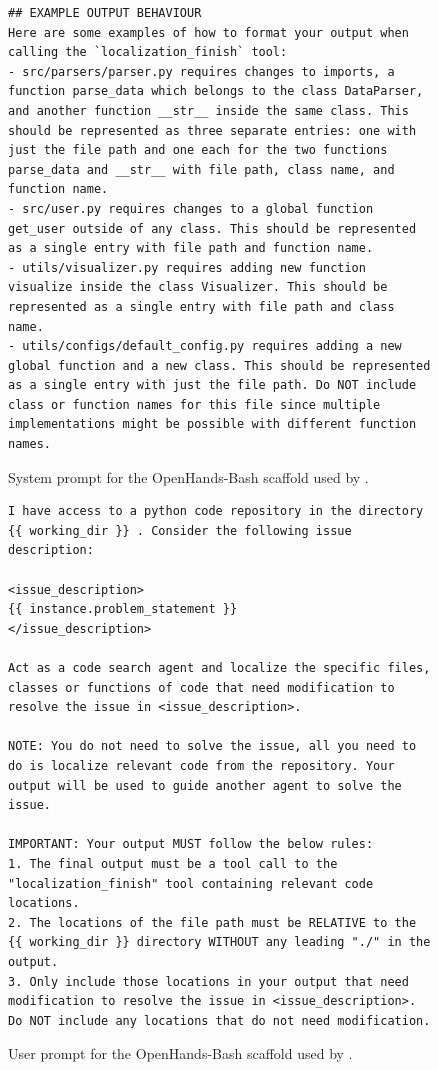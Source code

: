 \begin{figure}[!ht]
\begin{tcolorbox}[colback=blue!6!white, colframe=blue!75!black, title=System Prompt for the OpenHands-Bash agent used by \methodname]
\begin{lstlisting}
## EXAMPLE OUTPUT BEHAVIOUR
Here are some examples of how to format your output when calling the `localization_finish` tool:
- src/parsers/parser.py requires changes to imports, a function parse_data which belongs to the class DataParser, and another function __str__ inside the same class. This should be represented as three separate entries: one with just the file path and one each for the two functions parse_data and __str__ with file path, class name, and function name.
- src/user.py requires changes to a global function get_user outside of any class. This should be represented as a single entry with file path and function name.
- utils/visualizer.py requires adding new function visualize inside the class Visualizer. This should be represented as a single entry with file path and class name.
- utils/configs/default_config.py requires adding a new global function and a new class. This should be represented as a single entry with just the file path. Do NOT include class or function names for this file since multiple implementations might be possible with different function names.
\end{lstlisting}
\end{tcolorbox}
\caption{System prompt for the OpenHands-Bash scaffold used by \methodname.}
\label{fig:system_prompt2}
\end{figure}



\begin{figure}[!ht]
    \centering
\begin{tcolorbox}[colback=orange!6!white, colframe=orange!75!black, title=User prompt for the OpenHands-Bash agent used by \methodname]
\begin{lstlisting}
I have access to a python code repository in the directory {{ working_dir }} . Consider the following issue description:

<issue_description>
{{ instance.problem_statement }}
</issue_description>

Act as a code search agent and localize the specific files, classes or functions of code that need modification to resolve the issue in <issue_description>.

NOTE: You do not need to solve the issue, all you need to do is localize relevant code from the repository. Your output will be used to guide another agent to solve the issue.

IMPORTANT: Your output MUST follow the below rules:
1. The final output must be a tool call to the "localization_finish" tool containing relevant code locations.
2. The locations of the file path must be RELATIVE to the {{ working_dir }} directory WITHOUT any leading "./" in the output.
3. Only include those locations in your output that need modification to resolve the issue in <issue_description>. Do NOT include any locations that do not need modification.
\end{lstlisting}
\end{tcolorbox}
\caption{User prompt for the OpenHands-Bash scaffold used by \methodname.}
\label{fig:user_prompt}
\end{figure}


